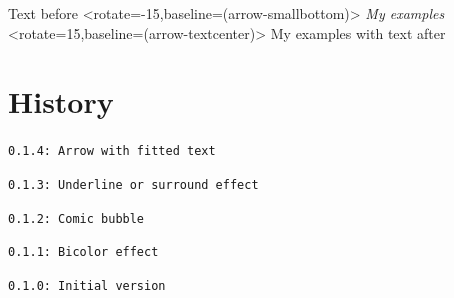 \documentclass[11pt,a4paper]{ltxdoc}
\begin{document}
\begin{DemoCode}{}
\end{DemoCode}

\begin{DemoCode}{}
Text before
\tkzfittextinarrow%
  [bheight=1em,sheight=0.6em,width=3em,color=green!50!black]%
  <rotate=-15,baseline=(arrow-smallbottom)>%
  {\itshape My examples}
\tkzfittextinarrow%
  [bheight=1em,sheight=0.6em,width=3em,color=green!50!black,expand]%
  <rotate=15,baseline=(arrow-textcenter)>%
  {\ttfamily My examples}
with text after
\end{DemoCode}

\pagebreak

\section{History}

\texttt{0.1.4: Arrow with fitted text}

\texttt{0.1.3: Underline or surround effect}

\texttt{0.1.2: Comic bubble}

\texttt{0.1.1: Bicolor effect}

\texttt{0.1.0: Initial version}
\end{document}
